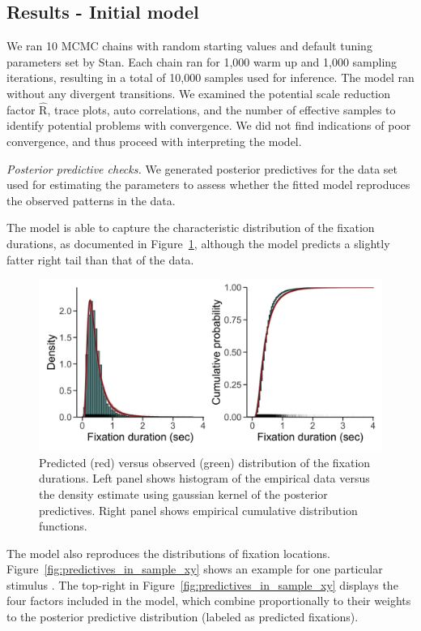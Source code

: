 \documentclass{article}
\begin{document}
\subsection{Results - Initial model}

We ran 10 MCMC chains with random starting values and default tuning parameters set by Stan. Each chain ran for 1,000 warm up and 1,000 sampling iterations, resulting in a total of 10,000 samples used for inference.
The model ran without any divergent transitions. We examined the potential scale reduction factor $\hat{\text{R}}$, trace plots, auto correlations, and the number of effective samples to identify potential problems with convergence. We did not find indications of poor convergence, and thus proceed with interpreting the model.


\textit{Posterior predictive checks.} We generated posterior predictives for the data set used for estimating the parameters to assess whether the fitted model reproduces the observed patterns in the data.

The model is able to capture the characteristic distribution of the fixation durations, as documented in Figure~\ref{fig:predictives_in_sample_durations}, although the model predicts a slightly fatter right tail than that of the data.

\begin{figure}
    \centering
    \includegraphics[width=\textwidth]{figures/fit_model/in_sample/fixation_durations.jpg}
    \caption{Predicted (red) versus observed (green) distribution of the fixation durations. Left panel shows histogram of the empirical data versus the density estimate using gaussian kernel of the posterior predictives. Right panel shows empirical cumulative distribution functions.}
    \label{fig:predictives_in_sample_durations}
\end{figure}

The model also reproduces the distributions of fixation locations.  Figure~\ref{fig:predictives_in_sample_xy} shows an example for one particular stimulus \citep[image number $251$ from][]{xu2014beyond}. The top-right in Figure~\ref{fig:predictives_in_sample_xy} displays the four factors included in the model, which combine proportionally to their weights to the posterior predictive distribution (labeled as predicted fixations).
\end{document}
